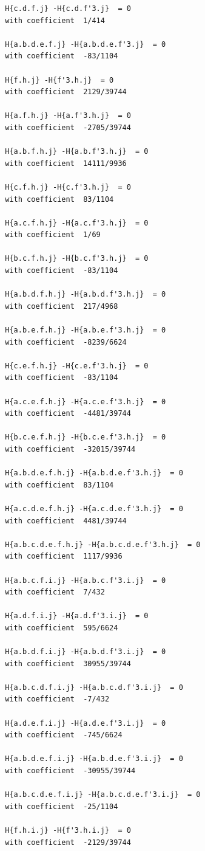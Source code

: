 \documentclass[11pt, a4paper]{kybernetika}
\begin{document}
\begin{verbatim}
		H{c.d.f.j} -H{c.d.f'3.j}  = 0
		with coefficient  1/414
		
		H{a.b.d.e.f.j} -H{a.b.d.e.f'3.j}  = 0
		with coefficient  -83/1104
		
		H{f.h.j} -H{f'3.h.j}  = 0
		with coefficient  2129/39744
		
		H{a.f.h.j} -H{a.f'3.h.j}  = 0
		with coefficient  -2705/39744
		
		H{a.b.f.h.j} -H{a.b.f'3.h.j}  = 0
		with coefficient  14111/9936
		
		H{c.f.h.j} -H{c.f'3.h.j}  = 0
		with coefficient  83/1104
		
		H{a.c.f.h.j} -H{a.c.f'3.h.j}  = 0
		with coefficient  1/69
		
		H{b.c.f.h.j} -H{b.c.f'3.h.j}  = 0
		with coefficient  -83/1104
		
		H{a.b.d.f.h.j} -H{a.b.d.f'3.h.j}  = 0
		with coefficient  217/4968
		
		H{a.b.e.f.h.j} -H{a.b.e.f'3.h.j}  = 0
		with coefficient  -8239/6624
		
		H{c.e.f.h.j} -H{c.e.f'3.h.j}  = 0
		with coefficient  -83/1104
		
		H{a.c.e.f.h.j} -H{a.c.e.f'3.h.j}  = 0
		with coefficient  -4481/39744
		
		H{b.c.e.f.h.j} -H{b.c.e.f'3.h.j}  = 0
		with coefficient  -32015/39744
		
		H{a.b.d.e.f.h.j} -H{a.b.d.e.f'3.h.j}  = 0
		with coefficient  83/1104
		
		H{a.c.d.e.f.h.j} -H{a.c.d.e.f'3.h.j}  = 0
		with coefficient  4481/39744
		
		H{a.b.c.d.e.f.h.j} -H{a.b.c.d.e.f'3.h.j}  = 0
		with coefficient  1117/9936
		
		H{a.b.c.f.i.j} -H{a.b.c.f'3.i.j}  = 0
		with coefficient  7/432
		
		H{a.d.f.i.j} -H{a.d.f'3.i.j}  = 0
		with coefficient  595/6624
		
		H{a.b.d.f.i.j} -H{a.b.d.f'3.i.j}  = 0
		with coefficient  30955/39744
		
		H{a.b.c.d.f.i.j} -H{a.b.c.d.f'3.i.j}  = 0
		with coefficient  -7/432
		
		H{a.d.e.f.i.j} -H{a.d.e.f'3.i.j}  = 0
		with coefficient  -745/6624
		
		H{a.b.d.e.f.i.j} -H{a.b.d.e.f'3.i.j}  = 0
		with coefficient  -30955/39744
		
		H{a.b.c.d.e.f.i.j} -H{a.b.c.d.e.f'3.i.j}  = 0
		with coefficient  -25/1104
		
		H{f.h.i.j} -H{f'3.h.i.j}  = 0
		with coefficient  -2129/39744
		

\end{verbatim}
\end{document}
